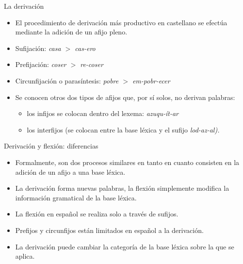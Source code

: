 \documentclass{beamer}
\begin{document}
\begin{frame}{La derivación}

\begin{itemize}
	\item El procedimiento de derivación más productivo en castellano se efectúa mediante la adición de un afijo pleno.
	\item Sufijación: \it{casa $>$ cas-ero}
	\item Prefijación: \it{coser $>$ re-coser}
	\item Circunfijación o parasíntesis: \it{pobre $>$ em-pobr-ecer}
	\item Se conocen otros dos tipos de afijos que, por sí solos, no derivan palabras: 
	\begin{itemize}
		\item los infijos se colocan dentro del lexema: \it{azuqu-ít-ar}
		\item los interfijos (se colocan entre la base léxica y el sufijo \it{lod-az-al}). 
	\end{itemize}
\end{itemize}

\end{frame}

\begin{frame}{Derivación y flexión: diferencias}

\begin{itemize}
	\item Formalmente, son dos procesos similares en tanto en cuanto consisten en la adición de un afijo a una base léxica.
	\item La derivación forma nuevas palabras, la flexión simplemente modifica la información gramatical de la base léxica.
	\item La flexión en español se realiza solo a través de sufijos.
	\item Prefijos y circunfijos están limitados en español a la derivación.
	\item La derivación puede cambiar la categoría de la base léxica sobre la que se aplica.
\end{itemize}
\end{frame}
\end{document}
